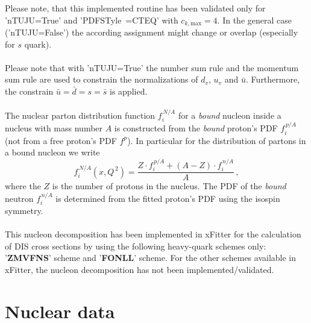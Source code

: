 \documentclass{article}
\begin{document}
\noindent Please note, that this implemented routine has been validated only for 'nTUJU=True' and '{PDFSTyle~=CTEQ}' with $c_{k,\mathrm{max}}=4$. In the general case ('nTUJU=False') the according assignment might change or overlap (especially for $s$ quark).\\
\\
Please note that with 'nTUJU=True' the number sum rule and the momentum sum rule are used to constrain the normalizations of $d_v$, $u_v$ and $\bar{u}$. Furthermore, the constrain $\bar{u}=\bar{d}=s=\bar{s}$ is applied.\\
\\
The nuclear parton distribution function $f_i^{\,N/A}$ for a \textit{bound} nucleon inside a nucleus with mass number $A$ is constructed from the \textit{bound} proton's PDF $f_i^{\,p/A}$ (not from a free proton's PDF $f^p$). In particular for the distribution of partons in a bound nucleon we write
\begin{equation}
f_i^{\,N/A} \left( x,Q^{\,2} \right) = \frac{Z\cdot f_i^{\,p/A}+ (A-Z)\cdot f_i^{\,n/A}}{A}\,,
\label{eq:nucleon}
\end{equation} 
where the $Z$ is the number of protons in the nucleus. The PDF of the \textit{bound} neutron $f_i^{\,n/A}$ is determined from the fitted proton's PDF using the isospin symmetry.\\
\\
This nucleon decomposition has been implemented in xFitter for the calculation of DIS cross sections by using the following heavy-quark schemes only: '\textbf{ZMVFNS}' scheme and '\textbf{FONLL}' scheme. For the other schemes available in xFitter, the nucleon decomposition has not been implemented/validated.

\section{Nuclear data}
\label{sec-nucldata}
\end{document}
